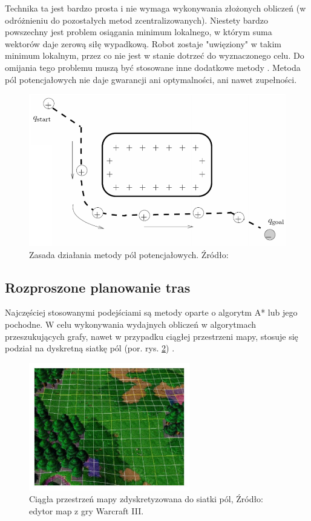 Technika ta jest bardzo prosta i nie wymaga wykonywania złożonych obliczeń (w odróżnieniu do pozostałych metod zcentralizowanych).
Niestety bardzo powszechny jest problem osiągania minimum lokalnego, w którym suma wektorów daje zerową siłę wypadkową. Robot zostaje "uwięziony" w takim minimum lokalnym, przez co nie jest w stanie dotrzeć do wyznaczonego celu. Do omijania tego problemu muszą być stosowane inne dodatkowe metody \cite{potentialfield}.
Metoda pól potencjałowych nie daje gwarancji ani optymalności, ani nawet zupełności.
\begin{figure}
	\centering
	\includegraphics[width=12cm]{img/potential-field}
	\caption{Zasada działania metody pól potencjałowych. Źródło: \cite{howie_potentialfield}}
	\label{fig:image_potentialfield}
\end{figure}

\subsection{Rozproszone planowanie tras}
Najczęściej stosowanymi podejściami są metody oparte o algorytm A* lub jego pochodne.
W celu wykonywania wydajnych obliczeń w algorytmach przeszukujących grafy, nawet w przypadku ciągłej przestrzeni mapy, stosuje się podział na dyskretną siatkę pól (por. rys. \ref{fig:img_games_warcraft-map-editor}) \cite{hierpathfindinginrts}.

\begin{figure}[H]
	\centering
	\includegraphics[width=7cm]{img/games/warcraft-map-editor}
	\caption{Ciągła przestrzeń mapy zdyskretyzowana do siatki pól, Źródło: edytor map z gry Warcraft III.}
	\label{fig:img_games_warcraft-map-editor}
\end{figure}

